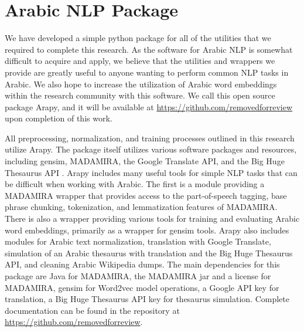 \section{Arabic NLP Package}
\label{sec:arapy}

We have developed a simple python package for all of the utilities that we required to complete this research. As the software for Arabic NLP is somewhat difficult to acquire and apply, we believe that the utilities and wrappers we provide are greatly useful to anyone wanting to perform common NLP tasks in Arabic. We also hope to increase the utilization of Arabic word embeddings within the research community with this software. We call this open source package Arapy, and it will be available at \url{https://github.com/removedforreview} upon completion of this work. 

All preprocessing, normalization, and training processes outlined in this research utilize Arapy. The package itself utilizes various software packages and resources, including gensim, MADAMIRA, the Google Translate API, and the Big Huge Thesaurus API \cite{rehurek_lrec,pasha:2014,google:online,bhl:online}. Arapy includes many useful tools for simple NLP tasks that can be difficult when working with Arabic. The first is a module providing a MADAMIRA wrapper that provides access to the part-of-speech tagging, base phrase chunking, tokenization, and lemmatization features of MADAMIRA. There is also a wrapper providing various tools for training and evaluating Arabic word embeddings, primarily as a wrapper for gensim tools. Arapy also includes modules for Arabic text normalization, translation with Google Translate, simulation of an Arabic thesaurus with translation and the Big Huge Thesaurus API, and cleaning Arabic Wikipedia dumps. The main dependencies for this package are Java for MADAMIRA, the MADAMIRA jar and a license for MADAMIRA, gensim for Word2vec model operations, a Google API key for translation, a Big Huge Thesaurus API key for thesaurus simulation. Complete documentation can be found in the repository at \url{https://github.com/removedforreview}.

